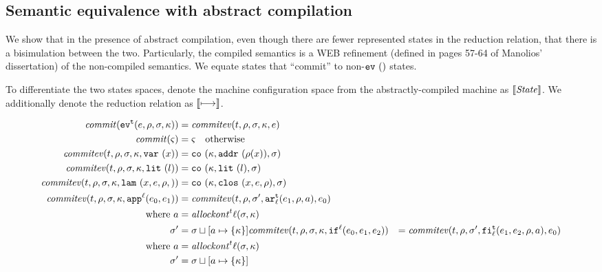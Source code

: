 \documentclass{llncs}
\begin{document}
\subsection{Semantic equivalence with abstract compilation}

We show that in the presence of abstract compilation, even though
there are fewer represented states in the reduction relation, that
there is a bisimulation between the two. Particularly, the compiled
semantics is a WEB refinement (defined in pages 57-64 of Manolios'
dissertation) of the non-compiled semantics. We equate states that
``commit'' to non-$\ev{}$ states.

To differentiate the two states spaces, denote the machine
configuration space from the abstractly-compiled machine as
$\CompState$. We additionally denote the reduction relation as $\cmachstep$.

\begin{align*}
\commit(\ev[^\mcntr]{\mexp,\menv,\msto,\mkont}) &= \commitev(\mcntr,\menv,\msto,\mkont,\mexp) \\
\commit(\mstate) &= \mstate \quad \text{otherwise} \\
\commitev(\mcntr,\menv,\msto,\mkont,\svar{\mvar}) &= \co{\mkont, \spchoice{\saddr{\menv(\mvar)}}{\superposition{\msto(\menv(\mvar))}},\msto} \\
\commitev(\mcntr,\menv,\msto,\mkont,\slit\mlit) &= \co{\mkont,\slit\mlit,\msto} \\
\commitev(\mcntr,\menv,\msto,\mkont,\slam{\mvar,\mexp,\menv}) &= \co{\mkont,\clos{\mvar,\mexp,\menv},\msto} \\
\commitev(\mcntr,\menv,\msto,\mkont,\sapp[^\mlab]{\mexpi0}{\mexpi1}) &=
  \commitev(\mcntr,\menv,\msto',\kar[^\mcntr_\mlab]{\mexpi1, \menv, \maddr},\mexpi0) \\
 \text{ where }\maddr &= \allockont^\mcntr\mlab(\msto,\mkont) \\
       \msto' &= \msto\sqcup[\maddr \mapsto \setof{\mkont}]
\commitev(\mcntr,\menv,\msto,\mkont,\sif[^\mlab]{\mexpi0}{\mexpi1}{\mexpi2}) &=
  \commitev(\mcntr,\menv,\msto',\kif[^\mcntr_\mlab]{\mexpi1, \mexpi2, \menv, \maddr},\mexpi0) \\
 \text{ where }\maddr &= \allockont^\mcntr\mlab(\msto,\mkont) \\
       \msto' &= \msto\sqcup[\maddr \mapsto \setof{\mkont}]
\end{align*}
\end{document}
